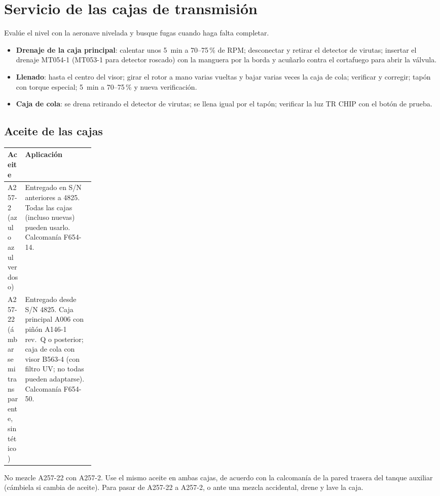 \section{Servicio de las cajas de transmisión}

Evalúe el nivel con la aeronave nivelada y busque fugas cuando haga falta completar.

\begin{itemize}
\item \textbf{Drenaje de la caja principal}: calentar unos 5~min a 70--75\,\% de RPM; desconectar y retirar el detector de virutas; insertar el drenaje MT054-1 (MT053-1 para detector roscado) con la manguera por la borda y acuñarlo contra el cortafuego para abrir la válvula.
\item \textbf{Llenado}: hasta el centro del visor; girar el rotor a mano varias vueltas y bajar varias veces la caja de cola; verificar y corregir; tapón con torque especial; 5~min a 70--75\,\% y nueva verificación.
\item \textbf{Caja de cola}: se drena retirando el detector de virutas; se llena igual por el tapón; verificar la luz TR CHIP con el botón de prueba.
\end{itemize}

\subsection{Aceite de las cajas}

\begin{center}
\small
\begin{tabularx}{\linewidth}{@{}>{\raggedright\arraybackslash}p{0.2\linewidth}>{\raggedright\arraybackslash}X@{}}
\toprule
Aceite & Aplicación \\
\midrule
A257-2 (azul o azul verdoso) & Entregado en S/N anteriores a 4825. Todas las cajas (incluso nuevas) pueden usarlo. Calcomanía F654-14. \\
A257-22 (ámbar semitransparente, sintético) & Entregado desde S/N 4825. Caja principal A006 con piñón A146-1 rev.~Q o posterior; caja de cola con visor B563-4 (con filtro UV; no todas pueden adaptarse). Calcomanía F654-50. \\
\bottomrule
\end{tabularx}
\end{center}

\begin{precaucion}
No mezcle A257-22 con A257-2. Use el mismo aceite en ambas cajas, de acuerdo con la calcomanía de la pared trasera del tanque auxiliar (cámbiela si cambia de aceite). Para pasar de A257-22 a A257-2, o ante una mezcla accidental, drene y lave la caja.
\end{precaucion}

